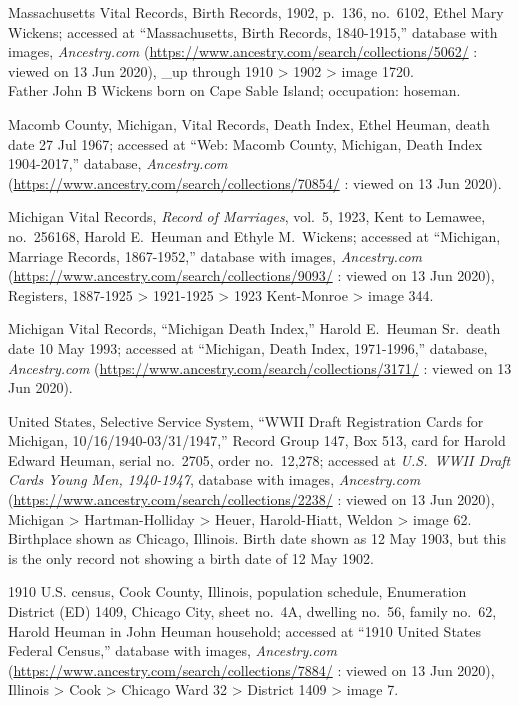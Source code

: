 \begin{thebibliography}{999}
	Massachusetts Vital Records, Birth Records, 1902, p.\ 136, no.\ 6102, Ethel Mary Wickens; accessed at ``Massachusetts, Birth Records, 1840-1915,'' database with images, \textit{Ancestry.com} (\url{https://www.ancestry.com/search/collections/5062/} : viewed on 13 Jun 2020), \_up through 1910 > 1902 > image 1720.\\
	Father John B Wickens born on Cape Sable Island; occupation: hoseman.
	
	Macomb County, Michigan, Vital Records, Death Index, Ethel Heuman, death date 27 Jul 1967; accessed at ``Web: Macomb County, Michigan, Death Index 1904-2017,'' database, \textit{Ancestry.com} (\url{https://www.ancestry.com/search/collections/70854/} : viewed on 13 Jun 2020).
	
	Michigan Vital Records, \textit{Record of Marriages}, vol.\ 5, 1923, Kent to Lemawee, no.\ 256168, Harold E.\ Heuman and Ethyle M.\ Wickens; accessed at ``Michigan, Marriage Records, 1867-1952,'' database with images, \textit{Ancestry.com} (\url{https://www.ancestry.com/search/collections/9093/} : viewed on 13 Jun 2020),  Registers, 1887-1925 > 1921-1925 > 1923 Kent-Monroe > image 344.
	
	Michigan Vital Records, ``Michigan Death Index,'' Harold E.\ Heuman Sr.\, death date 10 May 1993; accessed at ``Michigan, Death Index, 1971-1996,'' database, \textit{Ancestry.com} (\url{https://www.ancestry.com/search/collections/3171/} : viewed on 13 Jun 2020).
	
	United States, Selective Service System, ``WWII Draft Registration Cards for Michigan, 10/16/1940-03/31/1947,'' Record Group 147, Box 513, card for Harold Edward Heuman, serial no.\ 2705, order no.\ 12,278; accessed at \textit{U.S.\ WWII Draft Cards Young Men, 1940-1947}, database with images, \textit{Ancestry.com} (\url{https://www.ancestry.com/search/collections/2238/} : viewed on 13 Jun 2020), Michigan > Hartman-Holliday > Heuer, Harold-Hiatt, Weldon > image 62.\\
	Birthplace shown as Chicago, Illinois. Birth date shown as 12 May 1903, but this is the only record not showing a birth date of 12 May 1902.
	
	1910 U.S. census, Cook County, Illinois, population schedule, Enumeration District (ED) 1409, Chicago City, sheet no.\ 4A, dwelling no.\ 56, family no.\ 62, Harold Heuman in John Heuman household; accessed at ``1910 United States Federal Census,'' database with images, \textit{Ancestry.com} (\url{https://www.ancestry.com/search/collections/7884/} : viewed on 13 Jun 2020), Illinois > Cook > Chicago Ward 32 > District 1409 > image 7.
	

\end{thebibliography}
